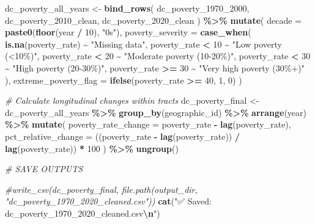 \documentclass[
]{article}
\newenvironment{Shaded}{\begin{snugshade}}{\end{snugshade}}
\newcommand{\AttributeTok}[1]{\textcolor[rgb]{0.13,0.29,0.53}{#1}}
\newcommand{\CommentTok}[1]{\textcolor[rgb]{0.56,0.35,0.01}{\textit{#1}}}
\newcommand{\DecValTok}[1]{\textcolor[rgb]{0.00,0.00,0.81}{#1}}
\newcommand{\FunctionTok}[1]{\textcolor[rgb]{0.13,0.29,0.53}{\textbf{#1}}}
\newcommand{\NormalTok}[1]{#1}
\newcommand{\OtherTok}[1]{\textcolor[rgb]{0.56,0.35,0.01}{#1}}
\newcommand{\SpecialCharTok}[1]{\textcolor[rgb]{0.81,0.36,0.00}{\textbf{#1}}}
\newcommand{\StringTok}[1]{\textcolor[rgb]{0.31,0.60,0.02}{#1}}
\begin{document}
\begin{Shaded}
\begin{Highlighting}[]
\NormalTok{dc\_poverty\_all\_years }\OtherTok{\textless{}{-}} \FunctionTok{bind\_rows}\NormalTok{(}
\NormalTok{  dc\_poverty\_1970\_2000,}
\NormalTok{  dc\_poverty\_2010\_clean,}
\NormalTok{  dc\_poverty\_2020\_clean}
\NormalTok{) }\SpecialCharTok{\%\textgreater{}\%}
  \FunctionTok{mutate}\NormalTok{(}
    \AttributeTok{decade =} \FunctionTok{paste0}\NormalTok{(}\FunctionTok{floor}\NormalTok{(year }\SpecialCharTok{/} \DecValTok{10}\NormalTok{), }\StringTok{"0s"}\NormalTok{),}
    \AttributeTok{poverty\_severity =} \FunctionTok{case\_when}\NormalTok{(}
      \FunctionTok{is.na}\NormalTok{(poverty\_rate) }\SpecialCharTok{\textasciitilde{}} \StringTok{"Missing data"}\NormalTok{,}
\NormalTok{      poverty\_rate }\SpecialCharTok{\textless{}} \DecValTok{10} \SpecialCharTok{\textasciitilde{}} \StringTok{"Low poverty (\textless{}10\%)"}\NormalTok{,}
\NormalTok{      poverty\_rate }\SpecialCharTok{\textless{}} \DecValTok{20} \SpecialCharTok{\textasciitilde{}} \StringTok{"Moderate poverty (10{-}20\%)"}\NormalTok{,}
\NormalTok{      poverty\_rate }\SpecialCharTok{\textless{}} \DecValTok{30} \SpecialCharTok{\textasciitilde{}} \StringTok{"High poverty (20{-}30\%)"}\NormalTok{,}
\NormalTok{      poverty\_rate }\SpecialCharTok{\textgreater{}=} \DecValTok{30} \SpecialCharTok{\textasciitilde{}} \StringTok{"Very high poverty (30\%+)"}
\NormalTok{    ),}
    \AttributeTok{extreme\_poverty\_flag =} \FunctionTok{ifelse}\NormalTok{(poverty\_rate }\SpecialCharTok{\textgreater{}=} \DecValTok{40}\NormalTok{, }\DecValTok{1}\NormalTok{, }\DecValTok{0}\NormalTok{)}
\NormalTok{  )}

\CommentTok{\# Calculate longitudinal changes within tracts}
\NormalTok{dc\_poverty\_final }\OtherTok{\textless{}{-}}\NormalTok{ dc\_poverty\_all\_years }\SpecialCharTok{\%\textgreater{}\%}
  \FunctionTok{group\_by}\NormalTok{(geographic\_id) }\SpecialCharTok{\%\textgreater{}\%}
  \FunctionTok{arrange}\NormalTok{(year) }\SpecialCharTok{\%\textgreater{}\%}
  \FunctionTok{mutate}\NormalTok{(}
    \AttributeTok{poverty\_rate\_change =}\NormalTok{ poverty\_rate }\SpecialCharTok{{-}} \FunctionTok{lag}\NormalTok{(poverty\_rate),}
    \AttributeTok{pct\_relative\_change =}\NormalTok{ ((poverty\_rate }\SpecialCharTok{{-}} \FunctionTok{lag}\NormalTok{(poverty\_rate)) }\SpecialCharTok{/} \FunctionTok{lag}\NormalTok{(poverty\_rate)) }\SpecialCharTok{*} \DecValTok{100}
\NormalTok{  ) }\SpecialCharTok{\%\textgreater{}\%}
  \FunctionTok{ungroup}\NormalTok{()}


\CommentTok{\# SAVE OUTPUTS}

\CommentTok{\#write\_csv(dc\_poverty\_final, file.path(output\_dir, "dc\_poverty\_1970\_2020\_cleaned.csv"))}
\FunctionTok{cat}\NormalTok{(}\StringTok{"✅ Saved: dc\_poverty\_1970\_2020\_cleaned.csv}\SpecialCharTok{\textbackslash{}n}\StringTok{"}\NormalTok{)}
\end{Highlighting}
\end{Shaded}
\end{document}
